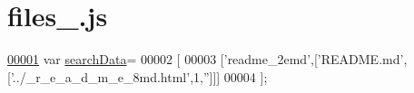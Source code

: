 \hypertarget{files__1_8js_source}{\section{files\+\_.\+js}
\label{files__1_8js_source}
}

\begin{DoxyCode}
\hypertarget{files__1_8js_source_l00001}{}\hyperlink{files__1_8js_ad01a7523f103d6242ef9b0451861231e}{00001} var \hyperlink{files__1_8js_ad01a7523f103d6242ef9b0451861231e}{searchData}=
00002 [
00003   [\textcolor{stringliteral}{'readme\_2emd'},[\textcolor{stringliteral}{'README.md'},[\textcolor{stringliteral}{'../\_r\_e\_a\_d\_m\_e\_8md.html'},1,\textcolor{stringliteral}{''}]]]
00004 ];
\end{DoxyCode}
